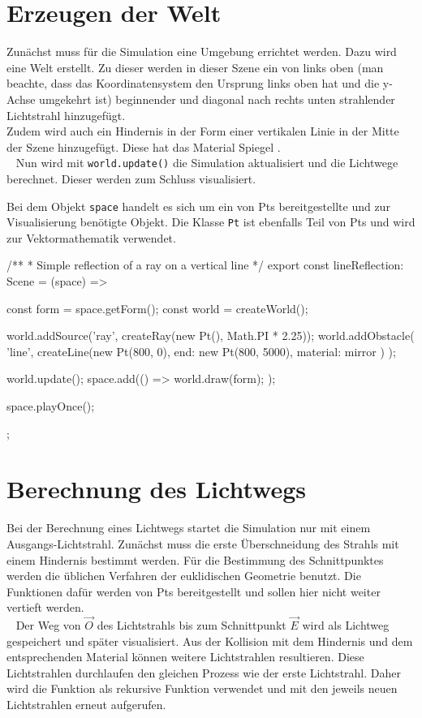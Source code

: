 \section{Erzeugen der Welt}
Zunächst muss für die Simulation eine Umgebung errichtet werden. Dazu wird eine Welt erstellt.
Zu dieser werden in dieser Szene ein von links oben (man beachte, dass das Koordinatensystem den 
Ursprung links oben hat und die y-Achse umgekehrt ist) beginnender und diagonal nach rechts 
unten strahlender Lichtstrahl hinzugefügt. \\
Zudem wird auch ein Hindernis in der Form einer vertikalen Linie in der Mitte der Szene hinzugefügt. 
Diese hat das Material Spiegel . \\ 
Nun wird mit \texttt{world.update()} die Simulation aktualisiert und die Lichtwege berechnet. Dieser werden zum Schluss visualisiert.

Bei dem Objekt \texttt{space} handelt es sich um ein von Pts bereitgestellte und zur Visualisierung benötigte Objekt. 
Die Klasse \texttt{Pt} ist ebenfalls Teil von Pts und wird zur Vektormathematik verwendet.
\newpage

\begin{verbnobox}[\scriptsize\mbox{}]
/**
 * Simple reflection of a ray on a vertical line
 */
export const lineReflection: Scene = (space) => {
    const form = space.getForm();
    const world = createWorld();

    world.addSource('ray', createRay(new Pt(), Math.PI * 2.25));
    world.addObstacle(
        'line',
        createLine(new Pt(800, 0), { end: new Pt(800, 5000), material: mirror })
    );

    world.update();
    space.add(() => {
        world.draw(form);
    });

    space.playOnce();
};
\end{verbnobox}

\section{Berechnung des Lichtwegs}
Bei der Berechnung eines Lichtwegs startet die Simulation nur mit einem Ausgangs-Lichtstrahl.
Zunächst muss die erste Überschneidung des Strahls mit einem Hindernis bestimmt werden. 
Für die Bestimmung des Schnittpunktes werden die üblichen Verfahren der euklidischen Geometrie benutzt. 
Die Funktionen dafür werden von Pts bereitgestellt und sollen hier nicht weiter vertieft werden. \\ 
Der Weg von $ \vec{O} $ des Lichtstrahls bis zum Schnittpunkt $ \vec{E} $ wird als Lichtweg gespeichert und später visualisiert.
Aus der Kollision mit dem Hindernis und dem entsprechenden Material können weitere Lichtstrahlen resultieren. 
Diese Lichtstrahlen durchlaufen den gleichen Prozess wie der erste Lichtstrahl. 
Daher wird die Funktion als rekursive Funktion verwendet und mit den jeweils neuen Lichtstrahlen erneut aufgerufen.


